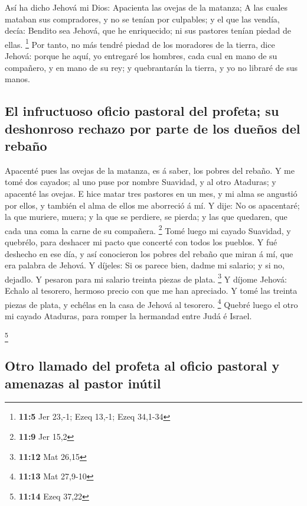  Así ha dicho Jehová mi Dios: Apacienta las ovejas de la
matanza;  A las cuales mataban sus compradores, y no se
tenían por culpables; y el que las vendía, decía: Bendito sea Jehová,
que he enriquecido; ni sus pastores tenían piedad de ellas. \footnote{\textbf{11:5}
  Jer 23,-1; Ezeq 13,-1; Ezeq 34,1-34}  Por tanto, no más
tendré piedad de los moradores de la tierra, dice Jehová: porque he
aquí, yo entregaré los hombres, cada cual en mano de su compañero, y en
mano de su rey; y quebrantarán la tierra, y yo no libraré de sus manos.

\hypertarget{el-infructuoso-oficio-pastoral-del-profeta-su-deshonroso-rechazo-por-parte-de-los-dueuxf1os-del-rebauxf1o}{%
\subsection{El infructuoso oficio pastoral del profeta; su deshonroso
rechazo por parte de los dueños del
rebaño}\label{el-infructuoso-oficio-pastoral-del-profeta-su-deshonroso-rechazo-por-parte-de-los-dueuxf1os-del-rebauxf1o}}

 Apacenté pues las ovejas de la matanza, es á saber, los
pobres del rebaño. Y me tomé dos cayados; al uno puse por nombre
Suavidad, y al otro Ataduras; y apacenté las ovejas.  E
hice matar tres pastores en un mes, y mi alma se angustió por ellos, y
también el alma de ellos me aborreció á mí.  Y dije: No os
apacentaré; la que muriere, muera; y la que se perdiere, se pierda; y
las que quedaren, que cada una coma la carne de su compañera.
\footnote{\textbf{11:9} Jer 15,2}  Tomé luego mi cayado
Suavidad, y quebrélo, para deshacer mi pacto que concerté con todos los
pueblos.  Y fué deshecho en ese día, y así conocieron los
pobres del rebaño que miran á mí, que era palabra de Jehová.
 Y díjeles: Si os parece bien, dadme mi salario; y si no,
dejadlo. Y pesaron para mi salario treinta piezas de plata. \footnote{\textbf{11:12}
  Mat 26,15}  Y díjome Jehová: Echalo al tesorero,
hermoso precio con que me han apreciado. Y tomé las treinta piezas de
plata, y echélas en la casa de Jehová al tesorero. \footnote{\textbf{11:13}
  Mat 27,9-10}  Quebré luego el otro mi cayado Ataduras,
para romper la hermandad entre Judá é Israel.

\footnote{\textbf{11:14} Ezeq 37,22}

\hypertarget{otro-llamado-del-profeta-al-oficio-pastoral-y-amenazas-al-pastor-inuxfatil}{%
\subsection{Otro llamado del profeta al oficio pastoral y amenazas al
pastor
inútil}\label{otro-llamado-del-profeta-al-oficio-pastoral-y-amenazas-al-pastor-inuxfatil}}

